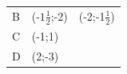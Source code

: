 {\begin{tabular}[t]{|l|l|l|}
    
        B &
    
    
        (-$1\frac{1}{2}$;-2) &
    
    
        (-2;-1$\frac{1}{2}$)%
     \tabularnewline\cline{1-1}\cline{2-2}\cline{3-3}
    
    
        C &
    
    
        (-1;1) &
    
    
     \tabularnewline\cline{1-1}\cline{2-2}\cline{3-3}
    
    
        D &
    
    
        (2;-3) &
    
    
     \tabularnewline\cline{1-1}\cline{2-2}\cline{3-3}
    \end{tabular}} %
